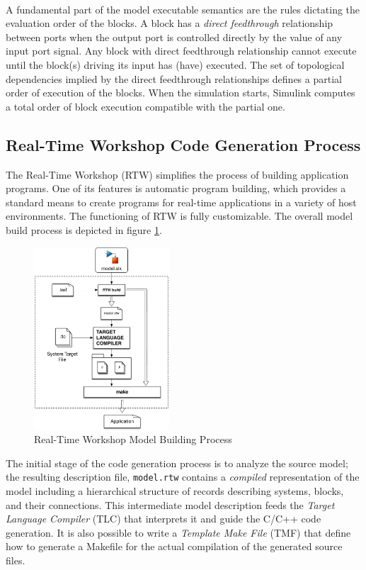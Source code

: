 \paragraph{} A fundamental part of the model executable semantics are the rules dictating the evaluation order of the blocks. A block has a \emph{direct feedthrough} relationship between ports when the output port is controlled directly by the value of any input port signal. Any block with direct feedthrough relationship cannot execute until the block(s) driving its input has (have) executed. The set of topological dependencies implied by the direct feedthrough relationships defines a partial order of execution of the blocks. When the simulation starts, Simulink computes a total order of block execution compatible with the partial one.

\subsection{Real-Time Workshop Code Generation Process}
\label{sec:RTWGenerationProcess}
The Real-Time Workshop (RTW) simplifies the process of building application programs. One of its features is automatic program building, which provides a standard means to create programs for real-time applications in a variety of host environments. The functioning of RTW is fully customizable. The overall model build process is depicted in figure \ref{fig:RTWBuildProcess}.

\begin{figure}[htbp] 
\centering    
\includegraphics[width=0.45\textwidth]{RTWBuildProcess}
\caption{Real-Time Workshop Model Building Process}
\label{fig:RTWBuildProcess}
\end{figure}
The initial stage of the code generation process is to analyze the source model; the resulting description file, \verb|model.rtw| contains a \emph{compiled} representation of the model including a hierarchical structure of records describing systems, blocks, and their connections. This intermediate model description feeds the \emph{Target Language Compiler\textregistered} (TLC) that interprets it and guide the C/C++ code generation. It is also possible to write a \emph{Template Make File} (TMF) that define how to generate a Makefile for the actual compilation of the generated source files.


